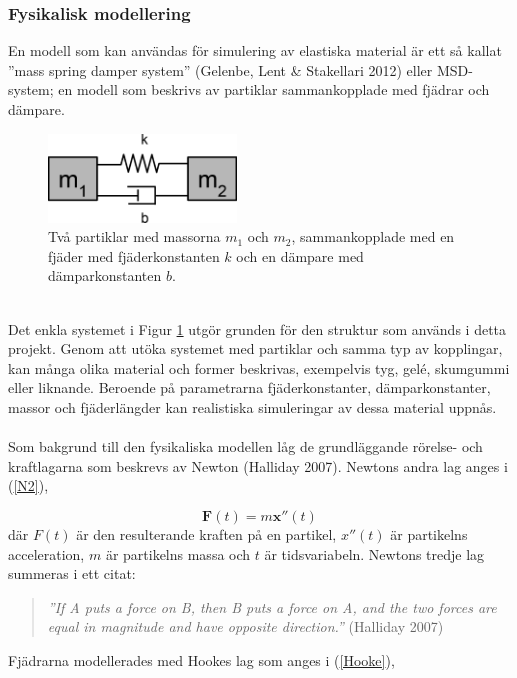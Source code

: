 \documentclass[a4paper,12pt,oneside,final,swedish]{extarticle}
\begin{document}
\subsubsection{Fysikalisk modellering}
En modell som kan användas för simulering av elastiska material är ett så kallat ''mass spring damper system'' (Gelenbe, Lent \& Stakellari 2012) eller MSD-system; en modell som beskrivs av partiklar sammankopplade med fjädrar och dämpare.\\
\begin{figure}[h!]
  \begin{center}
    \includegraphics[width=5cm]{Bilder/simple1D.png} 
  \end{center}
  \caption{Två partiklar med massorna $m_1$ och $m_2$, sammankopplade med en fjäder med fjäderkonstanten $k$ och en dämpare med dämparkonstanten $b$.}
  \label{m1m2::nonfloat}
\end{figure}
\\Det enkla systemet i Figur \ref{m1m2::nonfloat} utgör grunden för den struktur som används i detta projekt. Genom att utöka systemet med partiklar och samma typ av kopplingar, kan många olika material och former beskrivas, exempelvis tyg, gelé, skumgummi eller liknande. Beroende på parametrarna fjäderkonstanter, dämparkonstanter, massor och fjäderlängder kan realistiska simuleringar av dessa material uppnås.
\\\\Som bakgrund till den fysikaliska modellen låg de grundläggande rörelse- och kraftlagarna som beskrevs av Newton (Halliday 2007). Newtons andra lag anges i (\ref{N2}),

\begin{equation}
\mathbf F(t)=m\mathbf x''(t)
\label{N2}
\end{equation}
där $F(t)$ är den resulterande kraften på en partikel, $x''(t)$ är partikelns acceleration, $m$ är partikelns massa och $t$ är tidsvariabeln. Newtons tredje lag summeras i ett citat:
\begin{quote}\begin{center}\textit{''If A puts a force on B, then B puts a force on A, and the two forces are equal in magnitude and have opposite direction.''} (Halliday 2007)\end{center}\end{quote}
Fjädrarna modellerades med Hookes lag som anges i (\ref{Hooke}),
\end{document}
